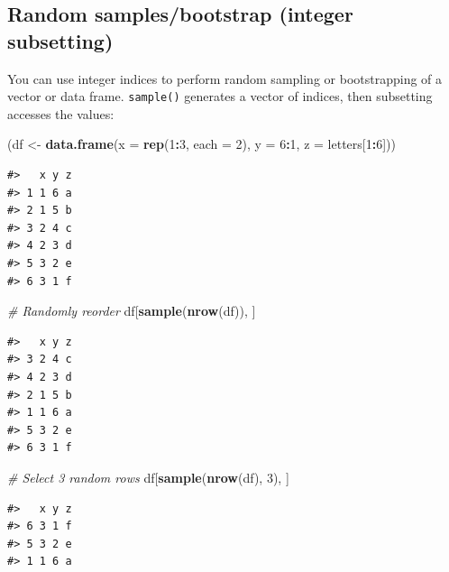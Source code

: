 \documentclass[]{book}
\newenvironment{Shaded}{\begin{snugshade}}{\end{snugshade}}
\newcommand{\KeywordTok}[1]{\textcolor[rgb]{0.13,0.29,0.53}{\textbf{#1}}}
\newcommand{\DataTypeTok}[1]{\textcolor[rgb]{0.13,0.29,0.53}{#1}}
\newcommand{\DecValTok}[1]{\textcolor[rgb]{0.00,0.00,0.81}{#1}}
\newcommand{\StringTok}[1]{\textcolor[rgb]{0.31,0.60,0.02}{#1}}
\newcommand{\CommentTok}[1]{\textcolor[rgb]{0.56,0.35,0.01}{\textit{#1}}}
\newcommand{\OperatorTok}[1]{\textcolor[rgb]{0.81,0.36,0.00}{\textbf{#1}}}
\newcommand{\NormalTok}[1]{#1}
\theoremstyle{definition}
\theoremstyle{definition}
\theoremstyle{definition}
\theoremstyle{remark}
\begin{document}
\subsection{Random samples/bootstrap (integer
subsetting)}\label{random-samplesbootstrap-integer-subsetting}

You can use integer indices to perform random sampling or bootstrapping
of a vector or data frame. \texttt{sample()} generates a vector of
indices, then subsetting accesses the values:

\begin{Shaded}
\begin{Highlighting}[]
\NormalTok{(df <-}\StringTok{ }\KeywordTok{data.frame}\NormalTok{(}\DataTypeTok{x =} \KeywordTok{rep}\NormalTok{(}\DecValTok{1}\OperatorTok{:}\DecValTok{3}\NormalTok{, }\DataTypeTok{each =} \DecValTok{2}\NormalTok{), }\DataTypeTok{y =} \DecValTok{6}\OperatorTok{:}\DecValTok{1}\NormalTok{, }\DataTypeTok{z =}\NormalTok{ letters[}\DecValTok{1}\OperatorTok{:}\DecValTok{6}\NormalTok{]))}
\end{Highlighting}
\end{Shaded}

\begin{verbatim}
#>   x y z
#> 1 1 6 a
#> 2 1 5 b
#> 3 2 4 c
#> 4 2 3 d
#> 5 3 2 e
#> 6 3 1 f
\end{verbatim}

\begin{Shaded}
\begin{Highlighting}[]
\CommentTok{# Randomly reorder}
\NormalTok{df[}\KeywordTok{sample}\NormalTok{(}\KeywordTok{nrow}\NormalTok{(df)), ]}
\end{Highlighting}
\end{Shaded}

\begin{verbatim}
#>   x y z
#> 3 2 4 c
#> 4 2 3 d
#> 2 1 5 b
#> 1 1 6 a
#> 5 3 2 e
#> 6 3 1 f
\end{verbatim}

\begin{Shaded}
\begin{Highlighting}[]
\CommentTok{# Select 3 random rows}
\NormalTok{df[}\KeywordTok{sample}\NormalTok{(}\KeywordTok{nrow}\NormalTok{(df), }\DecValTok{3}\NormalTok{), ]}
\end{Highlighting}
\end{Shaded}

\begin{verbatim}
#>   x y z
#> 6 3 1 f
#> 5 3 2 e
#> 1 1 6 a
\end{verbatim}
\end{document}
